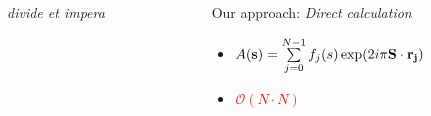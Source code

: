\documentclass[]{beamer}
\begin{document}
\begin{frame}
\begin{columns}
\begin{column}{0.5\textwidth}
\begin{block}{\textit{divide et impera}}
\begin{itemize}
                    \end{itemize}
                \end{block}
            \end{column}
            \vspace*{1.5cm}
            \begin{column}{0.5\textwidth}
                \begin{block}{Our approach: \itshape Direct calculation}
                    \begin{itemize}
                        \item \small $A({\bf s}) = \sum\limits_{j=0}^{N-1} f_{j}(s) \exp(2i\pi {\bf S}\cdot {\bf r_{j})}$  
                        \item \small \textcolor{red}{$\mathcal{O}(N\cdot N)$}
                    \end{itemize}
                \end{block}
            \end{column}
            \vspace*{-1.5cm}
        \end{columns}
\end{frame}
\end{document}
